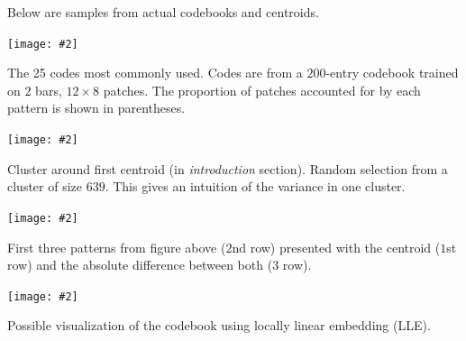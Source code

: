 \documentclass[portrait,a0b,final]{a0poster}
\newenvironment{poster}{
  \begin{center}
  \begin{minipage}[c]{0.98\textwidth}
}{
  \end{minipage} 
  \end{center}
}
\newcommand{\myfig}[3][0]{
\begin{center}
  \vspace{1.5cm}
  \texttt{[image: \#2]}
  \nobreak\medskip
\end{center}}
\begin{document}
\begin{poster}
\begin{multicols}{3}
Below are samples from actual codebooks and centroids.

\myfig[0]{codes1.ps}{.8}
\begin{center}
\begin{minipage}[c]{.7\columnwidth}
\begin{small}
The 25 codes most commonly used. 
Codes are from a $200$-entry codebook trained
on $2$ bars, $12 × 8$ patches. The proportion of patches accounted
for by each pattern is shown in parentheses.
\end{small}
\end{minipage}
\end{center}

\myfig[0]{close_patterns1.ps}{.8}
\begin{center}
\begin{minipage}[c]{.7\columnwidth}
\begin{small}
Cluster around first centroid (in \textit{introduction} section).
Random selection from a cluster of size $639$. 
This gives an intuition of the
variance in one cluster.
\end{small}
\end{minipage}
\end{center}

\myfig[0]{close_patterns_diff.ps}{.8}
\begin{center}
\begin{minipage}[c]{.7\columnwidth}
\begin{small}
First three patterns from figure above ($2$nd row) presented
with the centroid ($1$st row) and the absolute difference between 
both ($3$ row).
\end{small}
\end{minipage}
\end{center}

\newpage

\mbox{} %
\vspace{-1cm}
\myfig[0]{codes_lle.ps}{.8}

\begin{center}
\begin{minipage}[c]{.7\columnwidth}
\begin{small}
Possible visualization of the codebook using locally linear
embedding (LLE).
\end{small}
\end{minipage}
\end{center}


\end{multicols}
\end{poster}
\end{document}
